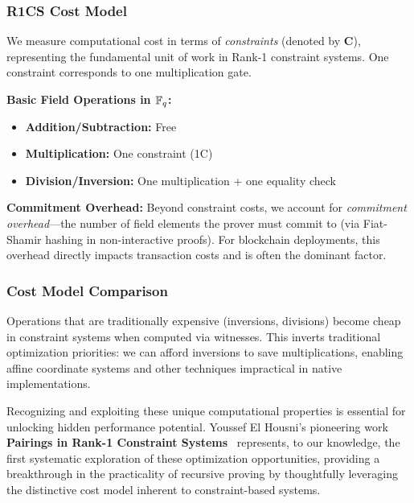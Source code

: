 \subsubsection{R1CS Cost Model}

We measure computational cost in terms of \textit{constraints} (denoted by \textbf{C}), representing the fundamental unit of work in Rank-1 constraint systems. One constraint corresponds to one multiplication gate.

\textbf{Basic Field Operations in $\mathbb{F}_q$:}
\begin{itemize}
\item \textbf{Addition/Subtraction:} Free
\item \textbf{Multiplication:} One constraint (1C)
\item \textbf{Division/Inversion:} One multiplication + one equality check
\end{itemize}

\textbf{Commitment Overhead:} Beyond constraint costs, we account for \textit{commitment overhead}---the number of field elements the prover must commit to (via Fiat-Shamir hashing in non-interactive proofs). For blockchain deployments, this overhead directly impacts transaction costs and is often the dominant factor.

\subsubsection{Cost Model Comparison}

Operations that are traditionally expensive (inversions, divisions) become cheap in constraint systems when computed via witnesses. This inverts traditional optimization priorities: we can afford inversions to save multiplications, enabling affine coordinate systems and other techniques impractical in native implementations.

Recognizing and exploiting these unique computational properties is essential for unlocking hidden performance potential. Youssef El Housni's pioneering work \textbf{Pairings in Rank-1 Constraint Systems}~\cite{ACNS:ElHousni23} represents, to our knowledge, the first systematic exploration of these optimization opportunities, providing a breakthrough in the practicality of recursive proving by thoughtfully leveraging the distinctive cost model inherent to constraint-based systems.
